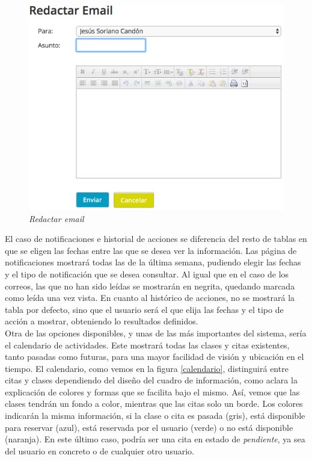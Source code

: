 \begin{figure}
\centering
  \includegraphics[scale=.50]{img/manual/redactar-email.jpg}
  \caption{\textit{Redactar email}}
  \label{fig:redactar-email}
\end{figure}

El caso de notificaciones e historial de acciones se diferencia del resto de tablas en que se eligen las fechas entre las que se desea ver la información. Las página de notificaciones mostrará todas las de la última semana, pudiendo elegir las fechas y el tipo de notificación que se desea consultar. Al igual que en el caso de los correos, las que no han sido leídas se mostrarán en negrita, quedando marcada como leída una vez vista. En cuanto al histórico de acciones, no se mostrará la tabla por defecto, sino que el usuario será el que elija las fechas y el tipo de acción a mostrar, obteniendo lo resultados definidos. \\

Otra de las opciones disponibles, y unas de las más importantes del sistema, sería el calendario de actividades. Este mostrará todas las clases y citas existentes, tanto pasadas como futuras, para una mayor facilidad de visión y ubicación en el tiempo. El calendario, como vemos en la figura \ref{calendario}, distinguirá entre citas y clases dependiendo del diseño del cuadro de información, como aclara la explicación de colores y formas que se facilita bajo el mismo. Así, vemos que las clases tendrán un fondo a color, mientras que las citas solo un borde. Los colores indicarán la misma información, si la clase o cita es pasada (gris), está disponible para reservar (azul), está reservada por el usuario (verde) o no está disponible (naranja). En este último caso, podría ser una cita en estado de \textit{pendiente}, ya sea del usuario en concreto o de cualquier otro usuario. 

